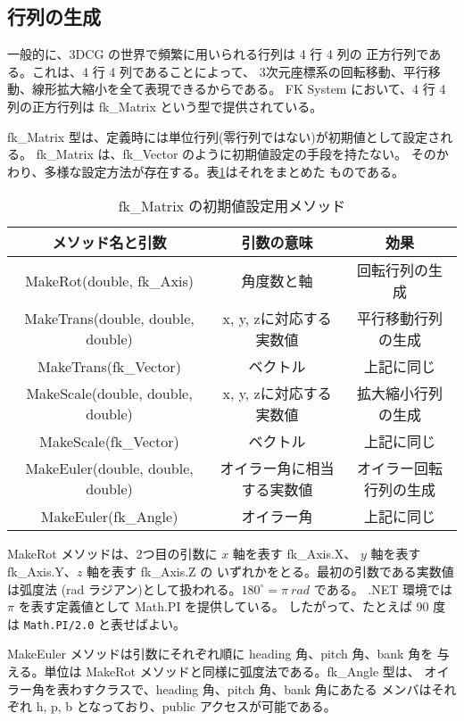 \subsection{行列の生成}
一般的に、3DCG の世界で頻繁に用いられる行列は 4 行 4 列の
正方行列である。これは、4 行 4 列であることによって、
3次元座標系の回転移動、平行移動、線形拡大縮小を全て表現できるからである。
FK System において、4 行 4 列の正方行列は fk\_Matrix という型で提供されている。

fk\_Matrix 型は、定義時には単位行列(零行列ではない)が初期値として設定される。
fk\_Matrix は、fk\_Vector のように初期値設定の手段を持たない。
そのかわり、多様な設定方法が存在する。表\ref{tbl:fkMat1}はそれをまとめた
ものである。

\begin{table}[H]
\caption{fk\_Matrix の初期値設定用メソッド}
\label{tbl:fkMat1}
\begin{center}
\begin{tabular}{|c|c|c|}
\hline
メソッド名と引数 & 引数の意味 & 効果 \\ \hline \hline
MakeRot(double, fk\_Axis) & 角度数と軸 &
        回転行列の生成 \\ \hline
MakeTrans(double, double, double) &
        x, y, zに対応する実数値 & 平行移動行列の生成 \\ \hline
MakeTrans(fk\_Vector) & ベクトル & 上記に同じ \\ \hline
MakeScale(double, double, double) &
        x, y, zに対応する実数値 & 拡大縮小行列の生成 \\ \hline
MakeScale(fk\_Vector) & ベクトル & 上記に同じ \\ \hline
MakeEuler(double, double, double) & オイラー角に相当する実数値 &
        オイラー回転行列の生成 \\ \hline
MakeEuler(fk\_Angle) & オイラー角 & 上記に同じ \\ \hline
\end{tabular}
\end{center}
\end{table}

MakeRot メソッドは、2つ目の引数に \(x\) 軸を表す fk\_Axis.X、
\(y\) 軸を表す fk\_Axis.Y、\(z\) 軸を表す fk\_Axis.Z の
いずれかをとる。最初の引数である実数値は弧度法
(rad ラジアン)として扱われる。\(180^\circ = \pi \: rad\) である。
.NET 環境では \(\pi\) を表す定義値として Math.PI を提供している。
したがって、たとえば 90 度は \verb+Math.PI/2.0+ と表せばよい。

MakeEuler メソッドは引数にそれぞれ順に heading 角、pitch 角、bank 角を
与える。単位は MakeRot メソッドと同様に弧度法である。fk\_Angle 型は、
オイラー角を表わすクラスで、heading 角、pitch 角、bank 角にあたる
メンバはそれぞれ h, p, b となっており、public アクセスが可能である。
